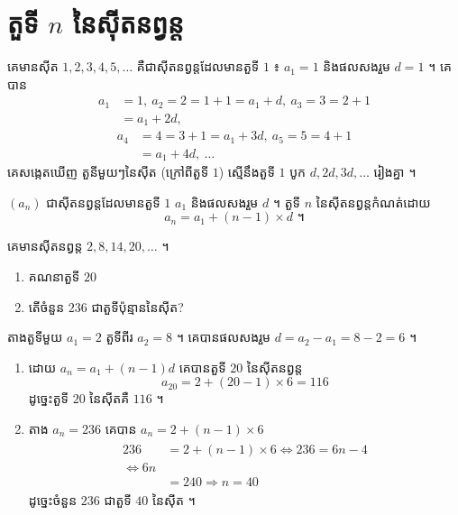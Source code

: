 \section{តួទី \texorpdfstring{$n$}{n} នៃស៊ីតនព្វន្ត}

\begin{example}[ឧទាហរណ៍]
គេមានស៊ីត $1, 2, 3, 4, 5, \ldots$ គឺជាស៊ីតនព្វន្តដែលមានតួទី $1$ ៖ $a_1 = 1$ និងផលសងរួម $d = 1$ ។ គេបាន
\[
\begin{aligned}
a_1 &= 1,\ a_2 = 2 = 1 + 1 = a_1 + d,\ a_3 = 3 = 2 + 1\\
&= a_1 + 2d,
\end{aligned}
\]
\[
\begin{aligned}
a_4 &= 4 = 3 + 1 = a_1 + 3d,\ a_5 = 5 = 4 + 1\\
&= a_1 + 4d,\ \ldots
\end{aligned}
\]
គេសង្កេតឃើញ តួនីមួយៗនៃស៊ីត (ក្រៅពីតួទី $1$) ស្មើនឹងតួទី $1$ បូក $d, 2d, 3d, \ldots$ រៀងគ្នា ។
\end{example}

\begin{formulaBox}[ជាទូទៅ]
$(a_n)$ ជាស៊ីតនព្វន្តដែលមានតួទី $1$ $a_1$ និងផលសងរួម $d$ ។ តួទី $n$ នៃស៊ីតនព្វន្តកំណត់ដោយ
\[
a_n = a_1 + (n - 1) \times d \text{ ។}
\]
\end{formulaBox}

\begin{example}[លំហាត់គំរូ ១]
គេមានស៊ីតនព្វន្ត $2, 8, 14, 20, \ldots$ ។
\begin{enumerate}[a]
  \item គណនាតួទី $20$
  \item តើចំនួន $236$ ជាតួទីប៉ុន្មាននៃស៊ីត?
\end{enumerate}
\end{example}
\ans
តាងតួទីមួយ $a_1 = 2$ តួទីពីរ $a_2 = 8$ ។ គេបានផលសងរួម $d = a_2 - a_1 = 8 - 2 = 6$ ។
\begin{enumerate}[a]
  \item ដោយ $a_n = a_1 + (n - 1)d$ គេបានតួទី $20$ នៃស៊ីតនព្វន្ត
  \[ a_{20} = 2 + (20 - 1) \times 6 = 116 \]
  ដូច្នេះតួទី $20$ នៃស៊ីតគឺ $116$ ។
  \item តាង $a_n = 236$ គេបាន $a_n = 2 + (n - 1) \times 6$
  \[
\begin{gathered}
\begin{aligned}
236 &= 2 + (n - 1) \times 6 \iff 236 = 6n - 4\\ \iff 6n\\
&= 240 \Rightarrow n = 40
\end{aligned}
\end{gathered}
\]
  ដូច្នេះចំនួន $236$ ជាតួទី $40$ នៃស៊ីត ។
\end{enumerate}

